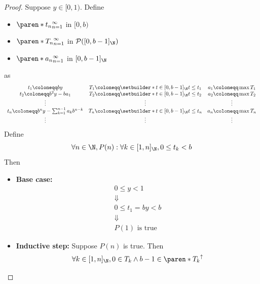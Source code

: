 \begin{proof}
  Suppose $y \in [0, 1)$. Define
  \begin{itemize}
    \item $\paren*{t_{n}}_{n = 1}^{\infty}$ in $[0, b)$
    \item $\paren*{T_{n}}_{n = 1}^{\infty}$ in $\mathcal{P}([0, b - 1]_{\N})$
    \item $\paren*{a_{n}}_{n = 1}^{\infty}$ in $[0, b - 1]_{\N}$
  \end{itemize}
  as
  \[
    \begin{array}{c@{\quad}c@{\quad}c}
      t_{1} \coloneqq by
       & T_{1} \coloneqq \setbuilder*{t \in [0, b - 1]_{\N}}{t \leq t_{1}}
       & a_{1} \coloneqq \max T_{1}                                        \\
      t_{2} \coloneqq b^{2}y - ba_{1}
       & T_{2} \coloneqq \setbuilder*{t \in [0, b - 1]_{\N}}{t \leq t_{2}}
       & a_{2} \coloneqq \max T_{2}                                        \\
      \vdots
       & \vdots
       & \vdots                                                            \\
      t_{n} \coloneqq b^{n}y - \sum_{k = 1}^{n - 1} a_{k}b^{n - k}
       & T_{n} \coloneqq \setbuilder*{t \in [0, b - 1]_{\N}}{t \leq t_{n}}
       & a_{n} \coloneqq \max T_{n}                                        \\
      \vdots
       & \vdots
       & \vdots
    \end{array}
  \]
  Define
  \[
    \forall n \in \N, P(n): \forall k \in [1, n]_{\N}, 0 \leq t_{k} < b
  \]
  Then
  \begin{itemize}
    \item \textbf{Base case:}
          \[
            \begin{array}{c}
              0 \leq y < 1          \\
              \Downarrow            \\
              0 \leq t_{1} = by < b \\
              \Downarrow            \\
              P(1) \text{ is true}
            \end{array}
          \]
    \item \textbf{Inductive step:} Suppose $P(n)$ is true. Then
          \[
            \begin{array}{c}
              \forall k \in [1, n]_{\N}, 0 \in T_{k} \land b - 1 \in \paren*{T_{k}}^{\uparrow} \\

\end{array}\]
\end{itemize}
\end{proof}
